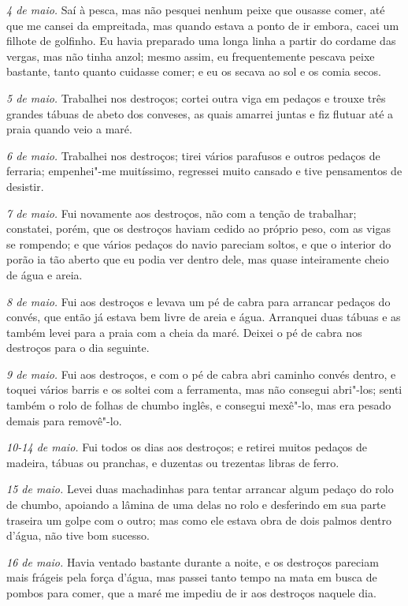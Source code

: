 \emph{4 de maio.} Saí à pesca, mas não pesquei nenhum peixe que ousasse
comer, até que me cansei da empreitada, mas quando estava a ponto de ir
embora, cacei um filhote de golfinho. Eu havia preparado uma longa linha
a partir do cordame das vergas, mas não tinha anzol; mesmo assim, eu
frequentemente pescava peixe bastante, tanto quanto cuidasse comer; e eu
os secava ao sol e os comia secos.

\emph{5 de maio.} Trabalhei nos destroços; cortei outra viga em pedaços
e trouxe três grandes tábuas de abeto dos conveses, as quais amarrei
juntas e fiz flutuar até a praia quando veio a maré.

\emph{6 de maio.} Trabalhei nos destroços; tirei vários parafusos e
outros pedaços de ferraria; empenhei"-me muitíssimo, regressei muito
cansado e tive pensamentos de desistir.

\emph{7 de maio.} Fui novamente aos destroços, não com a tenção de
trabalhar; constatei, porém, que os destroços haviam cedido ao próprio
peso, com as vigas se rompendo; e que vários pedaços do navio pareciam
soltos, e que o interior do porão ia tão aberto que eu podia ver dentro
dele, mas quase inteiramente cheio de água e areia.

\emph{8 de maio.} Fui aos destroços e levava um pé de cabra para
arrancar pedaços do convés, que então já estava bem livre de areia e
água. Arranquei duas tábuas e as também levei para a praia com a cheia
da maré. Deixei o pé de cabra nos destroços para o dia seguinte.

\emph{9 de maio.} Fui aos destroços, e com o pé de cabra abri caminho
convés dentro, e toquei vários barris e os soltei com a ferramenta, mas
não consegui abri"-los; senti também o rolo de folhas de chumbo inglês, e
consegui mexê"-lo, mas era pesado demais para removê"-lo.

\emph{10-14 de maio.} Fui todos os dias aos destroços; e retirei muitos
pedaços de madeira, tábuas ou pranchas, e duzentas ou trezentas libras
de ferro.

\emph{15 de maio.} Levei duas machadinhas para tentar arrancar algum
pedaço do rolo de chumbo, apoiando a lâmina de uma delas no rolo e
desferindo em sua parte traseira um golpe com o outro; mas como ele
estava obra de dois palmos dentro d'água, não tive bom sucesso.

\emph{16 de maio.} Havia ventado bastante durante a noite, e os
destroços pareciam mais frágeis pela força d'água, mas passei tanto
tempo na mata em busca de pombos para comer, que a maré me impediu de ir
aos destroços naquele dia.

